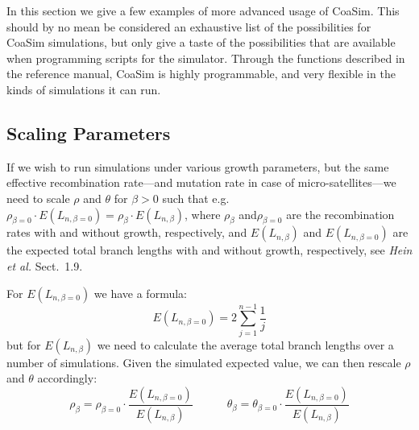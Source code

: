 \documentclass{manual}
\begin{document}
In this section we give a few examples of more advanced usage of
CoaSim.  This should by no mean be considered an exhaustive list of
the possibilities for CoaSim simulations, but only give a taste of the
possibilities that are available when programming scripts for the
simulator.  Through the functions described in the reference manual,
CoaSim is highly programmable, and very flexible in the kinds of
simulations it can run.


\subsection{Scaling Parameters}
\label{sec:scaling-parameters}

If we wish to run simulations under various growth parameters, but the
same effective recombination rate---and mutation rate in case of
micro-satellites---we need to scale $\rho$ and $\theta$ for $\beta>0$
such that e.g.\ 
$\rho_{\beta=0}\cdot{}E(L_{n,\beta=0})=\rho_\beta\cdot{}E(L_{n,\beta})$,
where $\rho_\beta$ and$\rho_{\beta=0}$ are the recombination rates
with and without growth, respectively, and $E(L_{n,\beta})$ and
$E(L_{n,\beta=0})$ are the expected total branch lengths with and
without growth, respectively, see \emph{Hein et al.} Sect.~1.9.

For $E(L_{n,\beta=0})$ we have a formula:
\begin{equation}
  \label{eq:1}
  E(L_{n,\beta=0})=2\sum_{j=1}^{n-1}\frac{1}{j}
\end{equation}
but for $E(L_{n,\beta})$ we need to calculate the average total branch
lengths over a number of simulations.  Given the simulated expected
value, we can then rescale $\rho$ and $\theta$ accordingly: 
\[\rho_\beta=\rho_{\beta=0}\cdot\frac{E(L_{n,\beta=0})}{E(L_{n,\beta})}
  \quad\quad\quad
  \theta_\beta=\theta_{\beta=0}\cdot\frac{E(L_{n,\beta=0})}{E(L_{n,\beta})}
\]
\end{document}
